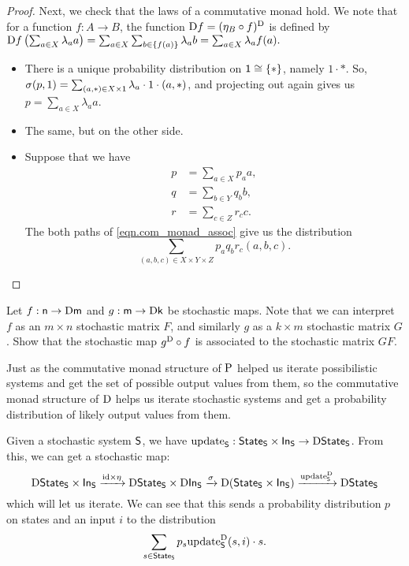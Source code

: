 \documentclass[DynamicalBook]{subfiles}
\begin{document}
\begin{proof}
  Next, we check that the laws of a commutative monad hold. We note that for a
  function $f : A \to B$, the function $\mathrm{D} f = (\eta_B \circ
  f)^{\mathrm{D}}$ is defined by
  $\mathrm{D} f\left( \sum_{a \in X} \lambda_a a \right) = \sum_{a \in X} \sum_{b
    \in \{f(a)\}} \lambda_a b = \sum_{a \in X} \lambda_a f(a).$
  \begin{itemize}
\item There is a unique probability distribution on $\mathsf{1} \cong \{\ast\}$,
  namely $1 \cdot \ast$. So, $\sigma(p, 1) = \sum_{(a, \ast) \in X \times
    \mathsf{1}} \lambda_a \cdot 1 \cdot (a, \ast)$, and projecting out again gives
  us $p = \sum_{a \in X} \lambda_a a$.
\item The same, but on the other side.
\item Suppose that we have
  \begin{align*}
    p &= \sum_{a \in X} p_a a, \\
    q &= \sum_{b \in Y} q_b b, \\
    r &= \sum_{c \in Z} r_c c.
  \end{align*}
  The both paths of \cref{eqn.com_monad_assoc} give us the distribution
  \[
\sum_{(a, b, c) \in X \times Y \times Z} p_a q_b r_c (a, b, c).
  \]
  \end{itemize}
\end{proof}

\begin{exercise}
  Let $f : \mathsf{n} \to \mathrm{D} \mathsf{m}$ and $g : \mathsf{m} \to \mathrm{D} \mathsf{k}$
  be stochastic maps. Note that we can interpret $f$ as an $m \times n$
  stochastic matrix $F$, and similarly $g$ as a $k \times m$ stochastic matrix $G$. Show
  that the stochastic map $g^{\mathrm{D}} \circ f$ is associated to the stochastic
  matrix $GF$.
\end{exercise}

Just as the commutative monad structure of $\mathrm{P}$ helped us iterate possibilistic systems
and get the set of possible output values from them, so the commutative monad
structure of $\mathrm{D}$ helps us iterate stochastic systems and get a
probability distribution of likely output values from them.

Given a stochastic system $\mathsf{S}$, we have $\mathrm{update}_{\mathsf{S}} : \mathsf{State}_{\mathsf{S}} \times
\mathsf{In}_{\mathsf{S}} \to \mathrm{D} \mathsf{State}_{\mathsf{S}}$. From this, we can get a stochastic map:
\[
\mathrm{D}\mathsf{State}_{\mathsf{S}} \times \mathsf{In}_{\mathsf{S}} \xrightarrow{\mathrm{id} \times \eta} \mathrm{D}\mathsf{State}_{\mathsf{S}} \times
\mathrm{D}\mathsf{In}_{\mathsf{S}} \xrightarrow{\sigma} \mathrm{D}(\mathsf{State}_{\mathsf{S}} \times \mathsf{In}_{\mathsf{S}})
\xrightarrow{\mathrm{update}_{\mathsf{S}}^{\mathrm{D}}} \mathrm{D}{\mathsf{State}_{\mathsf{S}}}
\]
which will let us iterate. We can see that this sends a probability distribution
$p$ on states and an input $i$ to the distribution
$$\sum_{s \in \mathsf{State}_{\mathsf{S}}} p_s\mathrm{update}_{\mathsf{S}}^{\mathrm{D}}(s, i) \cdot s.$$
\end{document}
